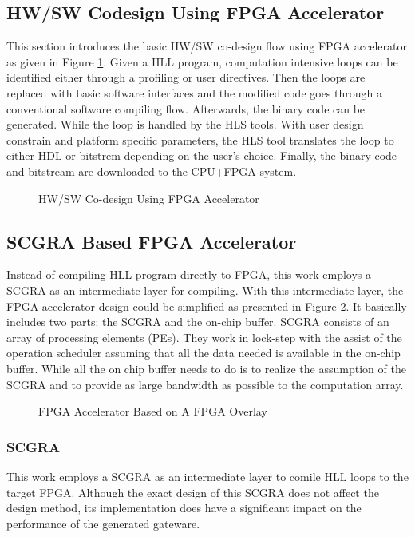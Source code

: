 \documentclass[12pt]{article} %
\begin{document}
\subsection{HW/SW Codesign Using FPGA Accelerator}
This section introduces the basic HW/SW co-design flow using FPGA accelerator as given in Figure
\ref{fig:codesign}. Given a HLL program, computation intensive loops can be identified either
through a profiling or user directives. Then the loops are replaced with basic software
interfaces and the modified code goes through a conventional software compiling flow. Afterwards, the
binary code can be generated. While the loop is handled by the HLS tools. With user design constrain 
and platform specific parameters, the HLS tool translates the loop to either HDL or bitstrem depending 
on the user's choice. Finally, the binary code and bitstream are downloaded to the CPU+FPGA system.

\begin{figure}[H]
\caption{HW/SW Co-design Using FPGA Accelerator}
\label{fig:codesign}
\end{figure}

\subsection{SCGRA Based FPGA Accelerator}
Instead of compiling HLL program directly to FPGA, this work employs a SCGRA as an intermediate
layer for compiling. With this intermediate layer, the FPGA accelerator design could be
simplified as presented in Figure \ref{fig:scgra-accelerator}. It basically includes two parts: the
SCGRA and the on-chip buffer. SCGRA consists of an array of processing elements (PEs). They work
in lock-step with the assist of the operation scheduler assuming that all the data needed is
available in the on-chip buffer. While all the on chip buffer needs to do is to realize the
assumption of the SCGRA and to provide as large bandwidth as possible to the computation array. 
\begin{figure}[H]
\caption{FPGA Accelerator Based on A FPGA Overlay}
\label{fig:scgra-accelerator}
\end{figure}

\subsubsection{SCGRA}
This work employs a SCGRA as an intermediate layer to comile HLL loops to the target FPGA. 
Although the exact design of this SCGRA does not affect the design method, its implementation does have a
significant impact on the performance of the generated gateware.  
\end{document}
